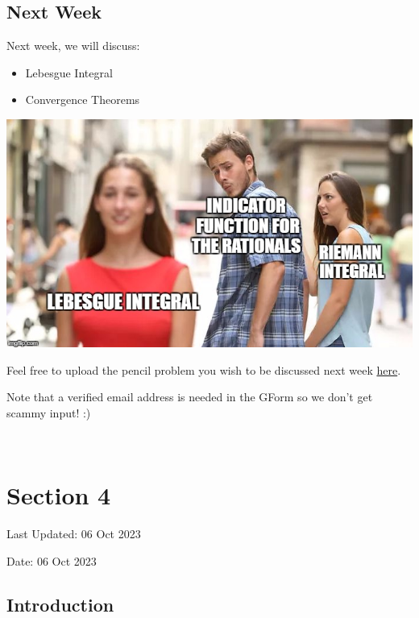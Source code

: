\documentclass[
  letterpaper,
  DIV=11,
  numbers=noendperiod]{scrreprt}
\providecommand{\tightlist}{%
  \setlength{\itemsep}{0pt}\setlength{\parskip}{0pt}}\usepackage{longtable,booktabs,array}
\theoremstyle{definition}
\theoremstyle{plain}
\theoremstyle{remark}
\begin{document}
\hypertarget{next-week-2}{%
\section*{Next Week}\label{next-week-2}}


Next week, we will discuss:

\begin{itemize}
\tightlist
\item
  Lebesgue Integral
\item
  Convergence Theorems
\end{itemize}

\includegraphics{./assets/img/lebesgue.jpeg}

Feel free to upload the pencil problem you wish to be discussed next
week \href{https://forms.gle/RBmMNYJp4u3qD5W79}{here}.

Note that a verified email address is needed in the GForm so we don't
get scammy input! :)

\(\,\)


\hypertarget{section-4}{%
\chapter*{Section 4}\label{section-4}}


Last Updated: 06 Oct 2023

Date: 06 Oct 2023

\hypertarget{introduction-3}{%
\section*{Introduction}\label{introduction-3}}
\end{document}
